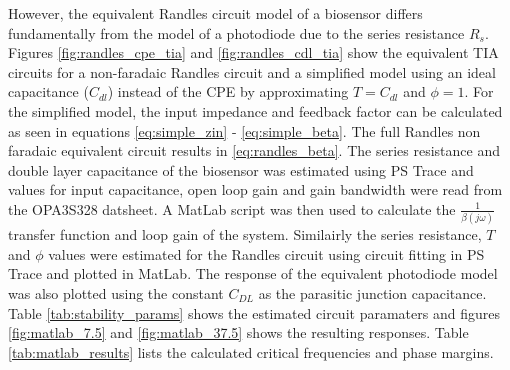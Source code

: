 However, the equivalent Randles circuit model of a biosensor differs fundamentally from the model of a photodiode due to the series resistance $R_s$. Figures \ref{fig:randles_cpe_tia} and \ref{fig:randles_cdl_tia} show the equivalent TIA circuits for a non-faradaic Randles circuit and a simplified model using an ideal capacitance ($C_{dl}$) instead of the \ac{CPE} by approximating $T=C_{dl}$ and $\phi=1$. For the simplified model, the input impedance and feedback factor can be calculated as seen in equations \ref{eq:simple_zin} - \ref{eq:simple_beta}. The full Randles non faradaic equivalent circuit results in \ref{eq:randles_beta}. The series resistance and double layer capacitance of the biosensor was estimated using PS Trace and values for input capacitance, open loop gain and gain bandwidth were read from the OPA3S328 datsheet. A MatLab script was then used to calculate the $\frac{1}{\beta(j\omega)}$ transfer function and loop gain of the system. Similairly the series resistance, $T$ and $\phi$ values were estimated for the Randles circuit using circuit fitting in PS Trace and plotted in MatLab. The response of the equivalent photodiode model was also plotted using the constant $C_{DL}$ as the parasitic junction capacitance. Table \ref{tab:stability_params} shows the estimated circuit paramaters and figures \ref{fig:matlab_7.5} and \ref{fig:matlab_37.5} shows the resulting responses. Table \ref{tab:matlab_results} lists the calculated critical frequencies and phase margins.


